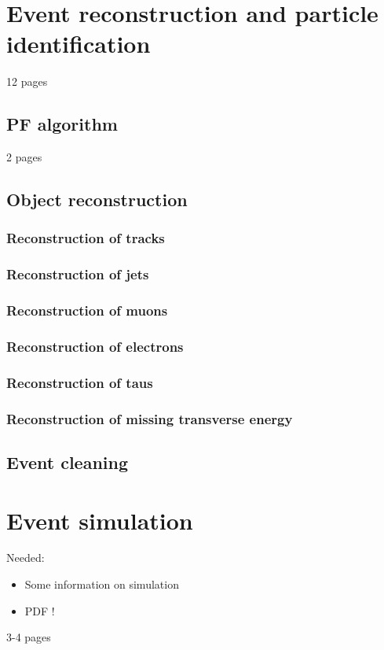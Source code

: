 \chapter{Event reconstruction and particle identification}
12 pages
\section{PF algorithm}
2 pages
\section{Object reconstruction}
\subsection*{Reconstruction of tracks}
\subsection*{Reconstruction of jets}
\subsection*{Reconstruction of muons}
\subsection*{Reconstruction of electrons}
\subsection*{Reconstruction of taus}
\subsection*{Reconstruction of missing transverse energy}
\section{Event cleaning}




\FloatBarrier
\chapter{Event simulation}

Needed:
\begin{itemize}
\item Some information on simulation
\item PDF !
\end{itemize}

3-4 pages

